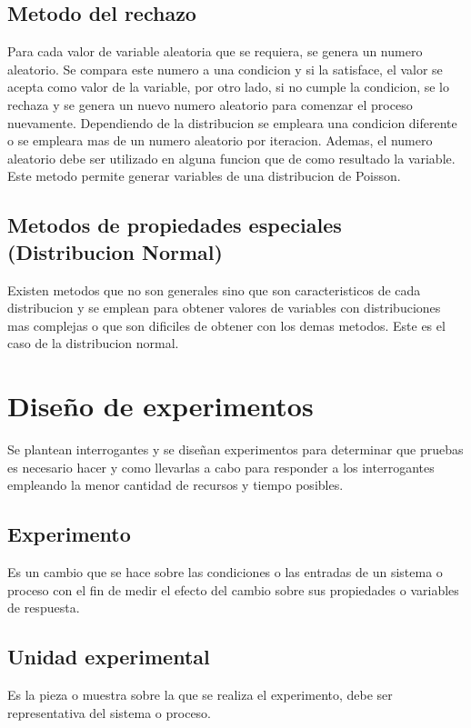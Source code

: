\documentclass[a4paper]{article}
\begin{document}
\subsection*{Metodo del rechazo}
Para cada valor de variable aleatoria que se requiera, se genera un numero aleatorio. Se compara este numero a una condicion
y si la satisface, el valor se acepta como valor de la variable, por otro lado, si no cumple la condicion, se lo rechaza y
se genera un nuevo numero aleatorio para comenzar el proceso nuevamente. Dependiendo de la distribucion se empleara una 
condicion diferente o se empleara mas de un numero aleatorio por iteracion. Ademas, el numero aleatorio debe ser utilizado 
en alguna funcion que de como resultado la variable.
Este metodo permite generar variables de una distribucion de Poisson.

\subsection*{Metodos de propiedades especiales (Distribucion Normal)}
Existen metodos que no son generales sino que son caracteristicos de cada distribucion y se emplean para obtener valores 
de variables con distribuciones mas complejas o que son dificiles de obtener con los demas metodos.
Este es el caso de la distribucion normal. %

\section*{Diseño de experimentos}
Se plantean interrogantes y se diseñan experimentos para determinar que pruebas es necesario hacer y como llevarlas a cabo para responder
a los interrogantes empleando la menor cantidad de recursos y tiempo posibles.

\subsection*{Experimento}
Es un cambio que se hace sobre las condiciones o las entradas de un sistema o proceso con el fin de medir el efecto del cambio sobre 
sus propiedades o variables de respuesta.

\subsection*{Unidad experimental}
Es la pieza o muestra sobre la que se realiza el experimento, debe ser representativa del sistema o proceso.
\end{document}

